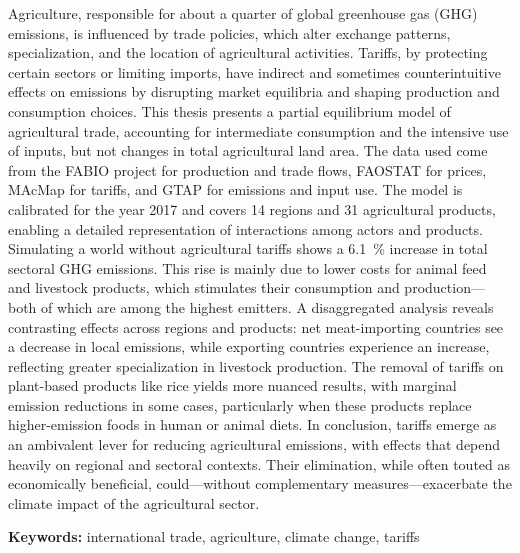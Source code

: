 
Agriculture, responsible for about a quarter of global greenhouse gas (GHG) emissions, is influenced by trade policies, which alter exchange patterns, specialization, and the location of agricultural activities. Tariffs, by protecting certain sectors or limiting imports, have indirect and sometimes counterintuitive effects on emissions by disrupting market equilibria and shaping production and consumption choices. This thesis presents a partial equilibrium model of agricultural trade, accounting for intermediate consumption and the intensive use of inputs, but not changes in total agricultural land area. The data used come from the FABIO project for production and trade flows, FAOSTAT for prices, MAcMap for tariffs, and GTAP for emissions and input use. The model is calibrated for the year 2017 and covers 14 regions and 31 agricultural products, enabling a detailed representation of interactions among actors and products.
Simulating a world without agricultural tariffs shows a 6.1~\% increase in total sectoral GHG emissions. This rise is mainly due to lower costs for animal feed and livestock products, which stimulates their consumption and production—both of which are among the highest emitters. A disaggregated analysis reveals contrasting effects across regions and products: net meat-importing countries see a decrease in local emissions, while exporting countries experience an increase, reflecting greater specialization in livestock production. The removal of tariffs on plant-based products like rice yields more nuanced results, with marginal emission reductions in some cases, particularly when these products replace higher-emission foods in human or animal diets.
In conclusion, tariffs emerge as an ambivalent lever for reducing agricultural emissions, with effects that depend heavily on regional and sectoral contexts. Their elimination, while often touted as economically beneficial, could—without complementary measures—exacerbate the climate impact of the agricultural sector.

\textbf{Keywords:} international trade, agriculture, climate change, tariffs